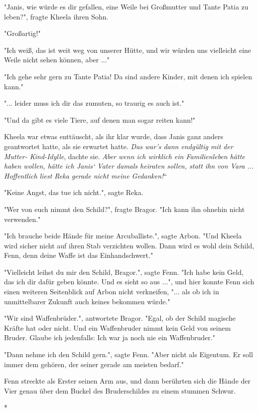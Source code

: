 \documentclass[10pt, a4paper, oneside]{book}
\begin{document}
\begin{multicols}{2}
"Janis, wie würde es dir gefallen, eine Weile bei Großmutter und Tante Patia zu leben?", fragte Kheela ihren Sohn. 

"Großartig!" 

"Ich weiß, das ist weit weg von unserer Hütte, und wir würden uns vielleicht eine Weile nicht sehen können, aber ..." 

"Ich gehe sehr gern zu Tante Patia! Da sind andere Kinder, mit denen ich spielen kann." 

"... leider muss ich dir das zumuten, so traurig es auch ist."

"Und da gibt es viele Tiere, auf denen man sogar reiten kann!"

Kheela war etwas enttäuscht, als ihr klar wurde, dass Janis ganz anders geantwortet hatte, als sie erwartet hatte. \textit{Das war’s dann endgültig mit der Mutter- Kind-Idylle}, dachte sie. \textit{Aber wenn ich wirklich ein Familienleben hätte haben wollen, hätte ich Janis‘ Vater damals heiraten sollen, statt ihn von Vara ... Hoffentlich liest Reka gerade nicht meine Gedanken!}“ 

"Keine Angst, das tue ich nicht.", sagte Reka. 

"Wer von euch nimmt den Schild?", fragte Bragor. "Ich kann ihn ohnehin nicht verwenden." 

"Ich brauche beide Hände für meine Arcuballiste.", sagte Arbon. "Und Kheela wird sicher nicht auf ihren Stab verzichten wollen. Dann wird es wohl dein Schild, Fenn, denn deine Waffe ist das Einhandschwert." 

"Vielleicht leihst du mir den Schild, Bragor.", sagte Fenn. "Ich habe kein Geld, das ich dir dafür geben könnte. Und es sieht so aus ...", und hier konnte Fenn sich einen weiteren Seitenblick auf Arbon nicht verkneifen, "... als ob ich in unmittelbarer Zukunft auch keines bekommen würde." 

"Wir sind Waffenbrüder.", antwortete Bragor. "Egal, ob der Schild magische Kräfte hat oder nicht. Und ein Waffenbruder nimmt kein Geld von seinem Bruder. Glaube ich jedenfalls: Ich war ja noch nie ein Waffenbruder." 

"Dann nehme ich den Schild gern.", sagte Fenn. "Aber nicht als Eigentum. Er soll immer dem gehören, der seiner gerade am meisten bedarf." 

Fenn streckte als Erster seinen Arm aus, und dann berührten sich die Hände der Vier genau über dem Buckel des Bruderschildes zu einem stummen Schwur. 

\begin{center}
    * 
\end{center}


\end{multicols}
\end{document}

